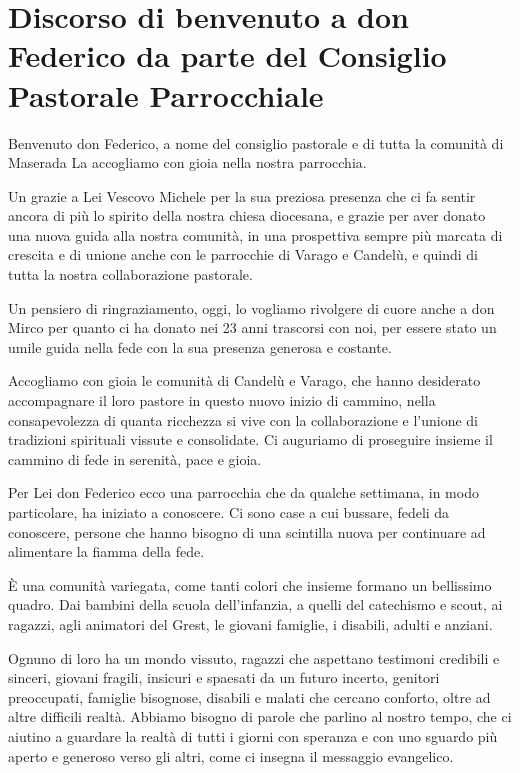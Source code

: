 \section{Discorso di benvenuto a don Federico da parte del Consiglio Pastorale Parrocchiale}

Benvenuto don Federico,
a nome del consiglio pastorale e di tutta la comunità di Maserada La accogliamo con gioia nella nostra parrocchia.

Un grazie a Lei Vescovo Michele per la sua preziosa presenza che ci fa sentir ancora di più lo spirito della nostra chiesa diocesana, e grazie per aver donato una nuova guida alla nostra comunità, in una prospettiva sempre più marcata di crescita e di unione anche con le parrocchie di Varago e Candelù, e quindi di tutta la nostra collaborazione pastorale.

Un pensiero di ringraziamento, oggi, lo vogliamo rivolgere di cuore anche a don Mirco per quanto ci ha donato nei 23 anni trascorsi con noi, per essere stato un umile guida nella fede con la sua presenza generosa e costante.

Accogliamo con gioia le comunità di Candelù e Varago, che hanno desiderato accompagnare il loro pastore in questo nuovo inizio di cammino, nella consapevolezza di quanta ricchezza si vive con la collaborazione e l'unione di tradizioni spirituali vissute e consolidate. Ci auguriamo di proseguire insieme il cammino di fede in serenità, pace e gioia.

Per Lei don Federico ecco una parrocchia che da qualche settimana, in modo particolare, ha iniziato a conoscere. Ci sono case a cui bussare, fedeli da conoscere, persone che hanno bisogno di una scintilla nuova per continuare ad alimentare la fiamma della fede.

È una comunità variegata, come tanti colori che insieme formano un bellissimo quadro. Dai bambini della scuola dell'infanzia, a quelli del catechismo e scout, ai ragazzi, agli animatori del Grest, le giovani famiglie, i disabili, adulti e anziani.

Ognuno di loro ha un mondo vissuto, ragazzi che aspettano testimoni credibili e sinceri, giovani fragili, insicuri e spaesati da un futuro incerto, genitori preoccupati, famiglie bisognose, disabili e malati che cercano conforto, oltre ad altre difficili realtà. Abbiamo bisogno di parole che parlino al nostro tempo, che ci aiutino a guardare la realtà di tutti i giorni con speranza e con uno sguardo più aperto e generoso verso gli altri, come ci insegna il messaggio evangelico.


